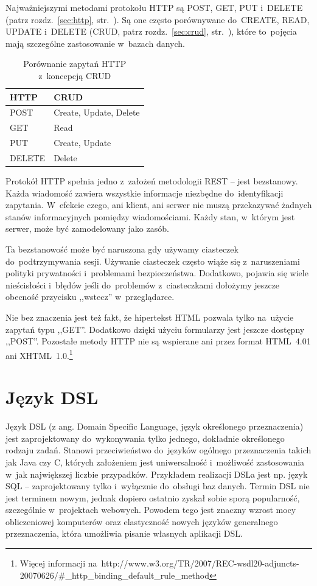\documentclass[a4paper,12pt,oneside]{report}
\begin{document}
Najważniejszymi metodami protokołu HTTP są POST, GET, PUT i~DELETE (patrz rozdz.~\ref{sec:http}, str.~\pageref{sec:http}). Są one często porównywane do~CREATE, READ, UPDATE i~DELETE (CRUD, patrz rozdz.~\ref{sec:crud}, str.~\pageref{sec:crud}), które to~pojęcia mają szczególne zastosowanie w~bazach danych.

\begin{table}[h]
  \centering
    \begin{tabular}{|l|l|}\hline
    HTTP   & CRUD \\\hline
    POST   & Create, Update, Delete \\
    GET    & Read \\
    PUT    & Create, Update \\
    DELETE & Delete \\\hline
    \end{tabular}
  \caption{Porównanie zapytań HTTP z~koncepcją CRUD\label{rest:crud}}
\end{table}

Protokół HTTP spełnia jedno z~założeń metodologii REST -- jest bezstanowy. Każda wiadomość zawiera wszystkie informacje niezbędne do~identyfikacji zapytania. W~efekcie czego, ani klient, ani serwer nie muszą przekazywać żadnych stanów informacyjnych pomiędzy wiadomościami. Każdy stan, w~którym jest serwer, może być zamodelowany jako zasób.

Ta bezstanowość może być naruszona gdy używamy ciasteczek do~podtrzymywania sesji. Używanie ciasteczek często wiąże się z~naruszeniami polityki prywatności i~problemami bezpieczeństwa. Dodatkowo, pojawia się wiele nieścisłości i~błędów jeśli do~problemów z~ciasteczkami dołożymy jeszcze obecność przycisku ,,wstecz'' w~przeglądarce.

Nie bez znaczenia jest też fakt, że hipertekst HTML pozwala tylko na~użycie zapytań typu ,,GET''. Dodatkowo dzięki użyciu formularzy jest jeszcze dostępny ,,POST''. Pozostałe metody HTTP nie są wspierane ani przez format HTML~4.01 ani XHTML~1.0.\footnote{Więcej informacji na~http://www.w3.org/TR/2007/REC-wsdl20-adjuncts-20070626/\#\_http\_binding\_default\_rule\_method}

\section{Język DSL}
\label{sec:dsl}
Język DSL (z ang. Domain Specific Language, język określonego przeznaczenia) jest zaprojektowany do~wykonywania tylko jednego, dokładnie określonego rodzaju zadań. Stanowi przeciwieństwo do~języków ogólnego przeznaczenia takich jak Java czy C, których założeniem jest uniwersalność i~możliwość zastosowania w~jak największej liczbie przypadków. Przykładem realizacji DSLa jest np. język SQL -- zaprojektowany tylko i~wyłącznie do~obsługi baz danych. Termin DSL nie jest terminem nowym, jednak dopiero ostatnio zyskał sobie sporą popularność, szczególnie w~projektach webowych. Powodem tego jest znaczny wzrost mocy obliczeniowej komputerów oraz elastyczność nowych języków generalnego przeznaczenia, która umożliwia pisanie własnych aplikacji DSL.
\end{document}
